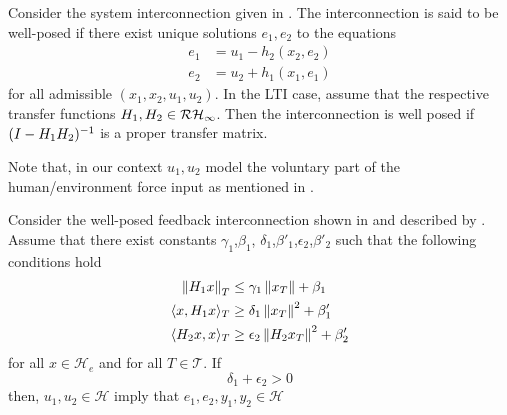 \begin{define} Consider the system interconnection given in . The interconnection is said to 
be well-posed if there exist unique solutions $e_1,e_2$ to the equations
\begin{align}\label{eq:apdx:passint1}
e_1 &= u_1-h_2(x_2,e_2)\\\label{eq:apdx:passint2}
e_2 &= u_2+h_1(x_1,e_1)
\end{align}
for all admissible $(x_1,x_2,u_1,u_2)$. In the LTI case, assume that the respective transfer functions $H_1,H_2\in\mathcal{RH}_\infty$. Then
the interconnection is well posed if $(I-H_1H_2)^{-1}$ is a proper transfer matrix.
\end{define}

Note that, in our context $u_1,u_2$ model the voluntary part of the human/en\-vi\-ron\-ment force input as mentioned 
in . 


\begin{thm}Consider the well-posed feedback interconnection shown in  and 
described by . Assume that there exist constants $\gamma_1$,$\beta_1$,
$\delta_1$,$\beta'_1$,$\epsilon_2$,$\beta'_2$ such that the following conditions hold
\begin{align}
\displaystyle \left\| H_1x \right\|_T &\leq \gamma_1\displaystyle \left\| x_T \right\|+\beta_1\\
\langle x,H_1x\rangle_T &\geq \delta_1\displaystyle \left\| x_T \right\|^2+\beta'_1\\
\langle H_2x,x\rangle_T &\geq \epsilon_2\displaystyle \left\| H_2x_T \right\|^2+\beta'_2
\end{align}
for all $x\in\mathcal{H}_e$ and for all $T\in\mathcal{T}$. If 
\begin{equation}
\delta_1+\epsilon_2 >0
\label{eq:apdx:actpas}
\end{equation}
then, $u_1,u_2 \in \mathcal{H}$ imply that $e_1,e_2,y_1,y_2\in\mathcal{H}$ 
\end{thm}

